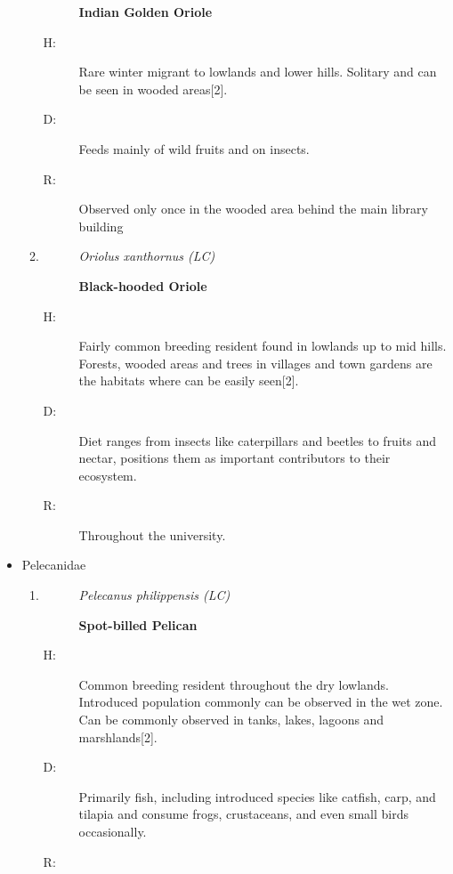 \begin{itemize}
\begin{enumerate}
\begin{description}
\textbf{Indian Golden Oriole}%
\end{description}%
\begin{description}%
\item[H: ]%
Rare winter migrant to lowlands and lower hills. Solitary and can be seen in wooded areas{[}2{]}.%
\item[D: ]%
Feeds mainly of wild fruits and on insects. %
\item[R: ]%
Observed only once in the wooded area behind the main library building%
\end{description}%
\item%
\begin{description}%
\item[]%
\textit{Oriolus xanthornus (LC)}%
\item[]%
\textbf{Black{-}hooded Oriole}%
\end{description}%
\begin{description}%
\item[H: ]%
Fairly common breeding resident found in lowlands up to mid hills. Forests, wooded areas and trees in villages and town gardens are the habitats where can be easily seen{[}2{]}.%
\item[D: ]%
Diet ranges from insects like caterpillars and beetles to fruits and nectar, positions them as important contributors to their ecosystem.%
\item[R: ]%
Throughout the university.%
\end{description}%
\end{enumerate}%
\item%
Pelecanidae%
\begin{enumerate}%
\item%
\begin{description}%
\item[]%
\textit{Pelecanus philippensis (LC)}%
\item[]%
\textbf{Spot{-}billed Pelican}%
\end{description}%
\begin{description}%
\item[H: ]%
Common breeding resident throughout the dry lowlands. Introduced population commonly can be observed in the wet zone.  Can be commonly observed in tanks, lakes, lagoons and marshlands{[}2{]}.%
\item[D: ]%
Primarily fish, including introduced species like catfish, carp, and tilapia and consume frogs, crustaceans, and even small birds occasionally.%
\item[R: ]%

\end{description}
\end{enumerate}
\end{itemize}
